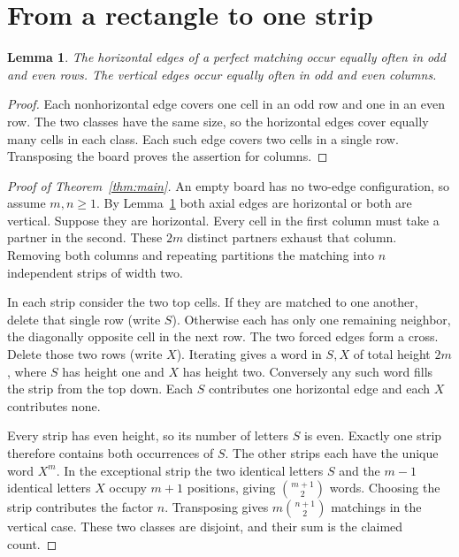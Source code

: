 \documentclass[11pt]{article}
\newtheorem{lemma}[theorem]{Lemma}
\begin{document}
\section{From a rectangle to one strip}

\begin{lemma}\label{lem:parity}
The horizontal edges of a perfect matching occur equally often in odd
and even rows. The vertical edges occur equally often in odd and even
columns.
\end{lemma}

\begin{proof}
Each nonhorizontal edge covers one cell in an odd row and one in an even
row. The two classes have the same size, so the horizontal edges cover
equally many cells in each class. Each such edge covers two cells in a
single row. Transposing the board proves the assertion for columns.
\end{proof}

\newpage
\begin{proof}[Proof of Theorem~\ref{thm:main}]
An empty board has no two-edge configuration, so assume \(m,n\geq1\).
By Lemma~\ref{lem:parity} both axial edges are horizontal or both are
vertical. Suppose they are horizontal. Every cell in the first column must
take a partner in the second. These \(2m\) distinct partners exhaust
that column. Removing both columns and repeating partitions the matching
into \(n\) independent strips of width two.

In each strip consider the two top cells. If they are matched to one
another, delete that single row (write \(S\)). Otherwise each has only one
remaining neighbor, the diagonally opposite cell in the next row.
The two forced edges form a cross. Delete those two rows (write \(X\)).
Iterating gives a word in \(S,X\) of total height \(2m\), where \(S\)
has height one and \(X\) has height two. Conversely any such word
fills the strip from the top down. Each \(S\) contributes one horizontal
edge and each \(X\) contributes none.

Every strip has even height, so its number of letters \(S\) is even.
Exactly one strip therefore contains both occurrences of \(S\).
The other strips each have the unique word \(X^m\). In the exceptional
strip the two identical letters \(S\) and the \(m-1\) identical letters
\(X\) occupy \(m+1\) positions, giving \(\binom{m+1}{2}\) words.
Choosing the strip contributes the factor \(n\). Transposing gives
\(m\binom{n+1}{2}\) matchings in the vertical case. These two classes are
disjoint, and their sum is the claimed count.
\end{proof}
\end{document}
